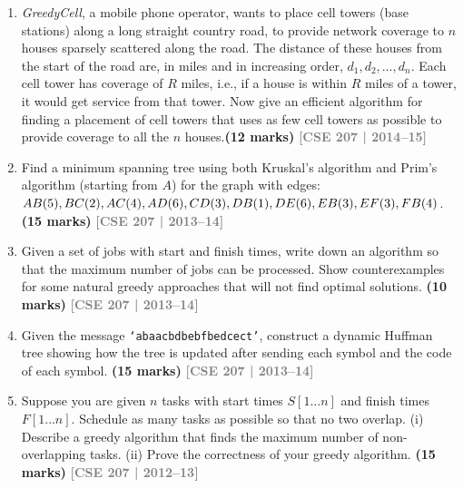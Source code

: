 \documentclass[12pt,a3paper]{article}
\newcommand{\yr}[1]{\hfill\textcolor{gray}{\small\textbf{[#1]}}}
\newcommand{\mk}[1]{\textcolor{orange!70!black}{\small\textbf{(#1 marks)}}}
\begin{document}
\begin{enumerate}
\begin{center}
\begin{tikzpicture}[
    every node/.style={circle, draw, minimum size=0.9cm, font=\bfseries},
    edge label/.style={rectangle, draw=none, font=\normalfont\small},
  ]
  \end{tikzpicture}

\end{center}

\item  \textit{GreedyCell}, a mobile phone operator, wants to place cell towers 
(base stations) along a long straight country road, to provide network coverage to $n$ 
houses sparsely scattered along the road. The distance of these houses from the start 
of the road are, in miles and in increasing order, $d_1, d_2, \ldots, d_n$. Each cell 
tower has coverage of $R$ miles, i.e., if a house is within $R$ miles of a tower, it 
would get service from that tower. Now give an efficient algorithm for finding a 
placement of cell towers that uses as few cell towers as possible to provide coverage 
to all the $n$ houses.\mk{12}
\yr{CSE 207 | 2014--15}

\item Find a minimum spanning tree using both Kruskal's algorithm and Prim's algorithm (starting from $A$) for the graph with edges: $AB(5), BC(2), AC(4), AD(6), CD(3),\\ DB(1), DE(6), EB(3), EF(3), FB(4)$. \mk{15}
\yr{CSE 207 | 2013--14}

\item Given a set of jobs with start and finish times, write down an algorithm so that the maximum number of jobs can be processed. Show counterexamples for some natural greedy approaches that will not find optimal solutions. \mk{10}
\yr{CSE 207 | 2013--14}

\item Given the message \texttt{`abaacbdbebfbedcect'}, construct a dynamic Huffman tree showing how the tree is updated after sending each symbol and the code of each symbol. \mk{15}
\yr{CSE 207 | 2013--14}

\item Suppose you are given $n$ tasks with start times $S[1 \ldots n]$ and finish times $F[1 \ldots n]$. Schedule as many tasks as possible so that no two overlap. (i) Describe a greedy algorithm that finds the maximum number of non-overlapping tasks. (ii) Prove the correctness of your greedy algorithm. \mk{15}
\yr{CSE 207 | 2012--13}


\end{enumerate}
\end{document}

